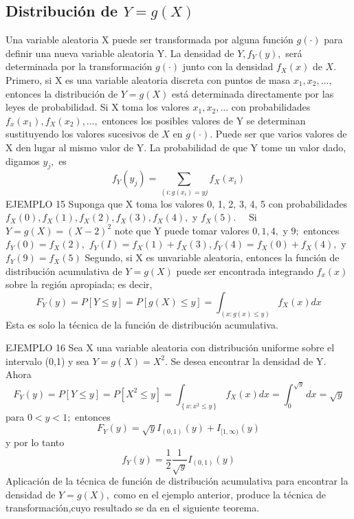 \subsection{Distribución de $Y=g(X)$}

Una variable aleatoria X puede ser transformada por alguna función $g(\cdot)$ para definir una nueva variable aleatoria Y. La densidad de $Y, f_{Y}(y),$ será determinada por la transformación $g(\cdot)$ junto con la densidad $f_{X}(x)$ de $X$.\\

Primero, si X es una variable aleatoria discreta con puntos de masa $x_{1}, x_{2}, \ldots,$ entonces la distribución de $Y=g(X)$ está determinada directamente por las leyes de probabilidad. Si X toma los valores $x_{1}, x_{2}, \ldots$ con probabilidades $f_{x}\left(x_{1}\right), f_{X}\left(x_{2}\right), \ldots,$ entonces los posibles valores de Y se determinan sustituyendo los valores sucesivos de $X$ en $g(\cdot) .$  Puede ser que varios valores de X den lugar al mismo valor de Y. La probabilidad de que Y tome un valor dado, digamos $y_{j},$ es
$$
f_{Y}\left(y_{j}\right)=\sum_{\left(i: g\left(x_{i}\right)=y j\right.} f_{X}\left(x_{i}\right)
$$
EJEMPLO 15 Suponga que X toma los valores 0, 1, 2, 3, 4, 5 con probabilidades $f_{X}(0), f_{X}(1), f_{X}(2), f_{X}(3), f_{X}(4),$ y $f_{X}(5) . \quad$ Si $Y=g(X)=(X-2)^{2}$
 note que Y puede tomar valores $0, 1, 4, $ y $9 ;$ entonces $f_{Y}(0)=f_{X}(2),$ $f_{Y}(I)=f_{X}(1)+f_{X}(3), f_{Y}(4)=f_{X}(0)+f_{X}(4),$ y $f_{Y}(9)=f_{X}(5)$
Segundo, si X es unvariable aleatoria, entonces la función de distribución acumulativa de $Y=g(X)$  puede ser encontrada integrando $f_{x}(x)$  sobre la región apropiada; es decir,
$$
F_{Y}(y)=P[Y \leq y]=P[g(X) \leq y]=\int_{(x: g(x) \leq y)} f_{X}(x) d x
$$
Esta es solo la técnica de la función de distribución acumulativa.

EJEMPLO 16 Sea X una variable aleatoria con distribución uniforme sobre el intervalo (0,1) y sea $Y=g(X)=X^{2} .$ Se desea encontrar la densidad de Y. Ahora
$$
F_{Y}(y)=P[Y \leq y]=P\left[X^{2} \leq y\right]=\int_{\left\{x: x^{2} \leq y\right\}} f_{X}(x) d x=\int_{0}^{\sqrt{y}} d x=\sqrt{y}
$$
para $0<y<1 ;$ entonces
$$
F_{Y}(y)=\sqrt{y} I_{(0,1)}(y)+I_{[1, \infty)}(y)
$$
y por lo tanto
$$
f_{Y}(y)=\frac{1}{2} \frac{1}{\sqrt{y}} I_{(0,1)}(y)
$$
Aplicación de la técnica de función de distribución acumulativa para encontrar la densidad de $Y=g(X),$ como en el ejemplo anterior, produce la técnica de transformación,cuyo resultado se da en el siguiente teorema.\\

